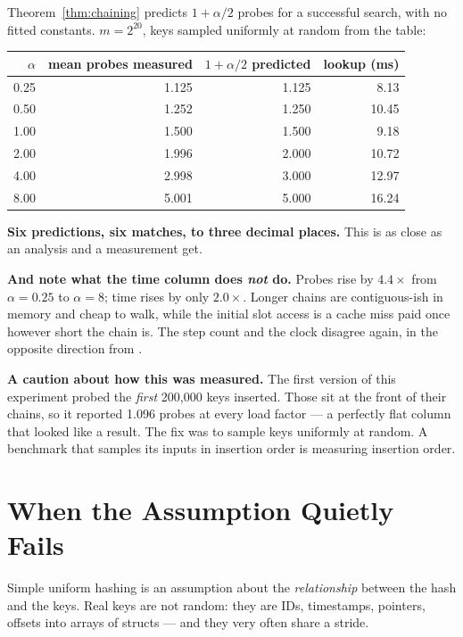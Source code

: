 \begin{worked}
Theorem~\ref{thm:chaining} predicts $1 + \alpha/2$ probes for a successful
search, with no fitted constants. $m = 2^{20}$, keys sampled uniformly at
random from the table:

\begin{center}
\begin{tabular}{@{}rrrr@{}}
\toprule
\rowcolor{primary!15}
$\alpha$ & mean probes measured & $1 + \alpha/2$ predicted & lookup (ms) \\
\midrule
0.25 & 1.125 & 1.125 &  8.13 \\
0.50 & 1.252 & 1.250 & 10.45 \\
1.00 & 1.500 & 1.500 &  9.18 \\
2.00 & 1.996 & 2.000 & 10.72 \\
4.00 & 2.998 & 3.000 & 12.97 \\
8.00 & 5.001 & 5.000 & 16.24 \\
\bottomrule
\end{tabular}
\end{center}

\smallskip
\textbf{Six predictions, six matches, to three decimal places.} This is as
close as an analysis and a measurement get.

\smallskip
\textbf{And note what the time column does \emph{not} do.} Probes rise by
$4.4\times$ from $\alpha = 0.25$ to $\alpha = 8$; time rises by only
$2.0\times$. Longer chains are contiguous-ish in memory and cheap to walk,
while the initial slot access is a cache miss paid once however short the chain
is. The step count and the clock disagree again, in the opposite direction
from .

\smallskip
\textbf{A caution about how this was measured.} The first version of this
experiment probed the \emph{first} 200{,}000 keys inserted. Those sit at the
front of their chains, so it reported 1.096 probes at every load factor --- a
perfectly flat column that looked like a result. The fix was to sample keys
uniformly at random. A benchmark that samples its inputs in insertion order is
measuring insertion order.
\end{worked}

\section{When the Assumption Quietly Fails}

Simple uniform hashing is an assumption about the \emph{relationship} between
the hash and the keys. Real keys are not random: they are IDs, timestamps,
pointers, offsets into arrays of structs --- and they very often share a
stride.

